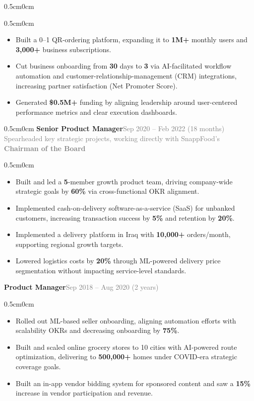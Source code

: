\documentclass[a4paper,10pt]{article}
\newcommand{\info}[1]{#1}
\newcommand{\RoleStyle}{\fontsize{12}{14}\selectfont\bfseries}
\newcommand{\BodyStyle}{\fontsize{10}{12}\selectfont}
\newcommand{\position}[1]{{\RoleStyle \info{#1}}}\vspace{0.05em}
\newcommand{\bulletitem}[1]{\item {\BodyStyle \info{#1}}\vspace{0.1em}}
\newcommand{\graytext}[1]{\textcolor{grey}{\info{#1}}}
\newcommand{\kpi}[1]{\textbf{#1}}
\begin{document}
{\begin{adjustwidth}{0.5cm}{0cm}
\begin{adjustwidth}{0.5cm}{0cm}
\begin{itemize}
  \bulletitem{Built a 0--1 QR-ordering platform, expanding it to \kpi{1M+} monthly users and \kpi{3,000+} business subscriptions.}
  \bulletitem{Cut business onboarding from \kpi{30} days to \kpi{3} via AI-facilitated workflow automation and customer-relationship-management (CRM) integrations, increasing partner satisfaction (Net Promoter Score).}
  \bulletitem{Generated \kpi{\$0.5M+} funding by aligning leadership around user-centered performance metrics and clear execution dashboards.}
\end{itemize}
\end{adjustwidth}
\end{adjustwidth}
\vspace{3pt}
\begin{adjustwidth}{0.5cm}{0cm}
{{\position{\info{Senior Product Manager}}}\hfill {\large\graytext{\info{Sep 2020 – Feb 2022 (18 months)}}}}
\\
{\small\graytext{\info{Spearheaded key strategic projects, working directly with SnappFood's \textbf{Chairman of the Board}}}}
\normalsize
\begin{adjustwidth}{0.5cm}{0cm}
\begin{itemize}
  \bulletitem{Built and led a \kpi{5}-member growth product team, driving company-wide strategic goals by \kpi{60\%} via cross-functional OKR alignment.}
  \bulletitem{Implemented cash-on-delivery software-as-a-service (SaaS) for unbanked customers, increasing transaction success by \kpi{5\%} and retention by \kpi{20\%}.}
  \bulletitem{Implemented a delivery platform in Iraq with \kpi{10,000+} orders/month, supporting regional growth targets.}
  \bulletitem{Lowered logistics costs by \kpi{20\%} through ML-powered delivery price segmentation without impacting service-level standards.}
\end{itemize}
\end{adjustwidth}
\vspace{3pt}
{{\position{\info{Product Manager}}}\hfill \large\graytext{\info{Sep 2018 – Aug 2020 (2 years)}}}
\normalsize
\begin{adjustwidth}{0.5cm}{0cm}
\begin{itemize}
  \bulletitem{Rolled out ML-based seller onboarding, aligning automation efforts with scalability OKRs and decreasing onboarding by \kpi{75\%}.}
  \bulletitem{Built and scaled online grocery stores to 10 cities with AI-powered route optimization, delivering to \kpi{500,000+} homes under COVID-era strategic coverage goals.}
 \bulletitem{Built an in-app vendor bidding system for sponsored content and saw a \kpi{15\%} increase in vendor participation and revenue.}
\end{itemize}
\end{adjustwidth}
\end{adjustwidth}
\vspace{3pt}

}
\end{document}
